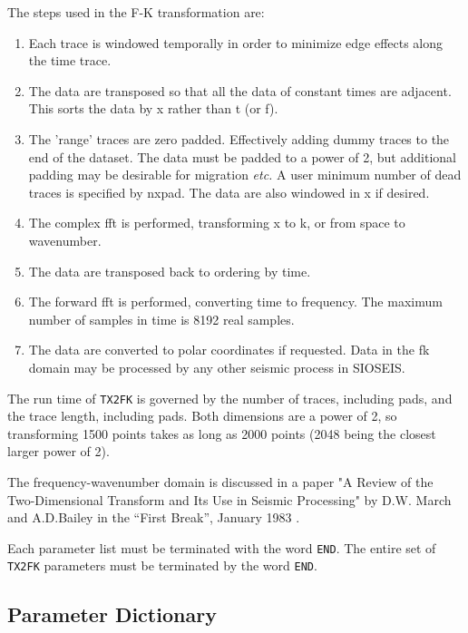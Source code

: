 The steps used in the F-K transformation are:
\begin{enumerate}
    \item  Each trace is windowed temporally in order to minimize edge effects
     along the time trace.
 \item  The data are transposed so that all the data of constant times are
     adjacent. This sorts the data by x rather than t (or f).
 \item  The 'range' traces are zero padded. Effectively adding dummy traces
     to the end of the dataset. The data must be padded to a power of 2,
     but additional padding may be desirable for migration \textit{etc.} A user
     minimum number of dead traces is specified by nxpad. The data are
     also windowed in x if desired.
 \item  The complex \gls{fft} is performed, transforming x to k, or from space to
     wavenumber.
 \item  The data are transposed back to ordering by time.
 \item  The forward \gls{fft} is performed, converting time to frequency.  The
     maximum number of samples in time is 8192 real samples.
 \item  The data are converted to polar coordinates if requested.  Data in
     the fk domain may be processed by any other seismic process in
     SIOSEIS.
\end{enumerate}

The run time of \texttt{TX2FK} is governed by the number of traces, including pads,
and the trace length, including pads.  Both dimensions are a power of 2,
so transforming 1500 points takes as long as 2000 points (2048 being the
closest larger power of 2).

The frequency-wavenumber domain is discussed in a paper "A Review of the
Two-Dimensional Transform and Its Use in Seismic Processing" by
D.W. March and A.D.Bailey in the ``First Break'', January 1983 \cite{March1983}.

Each parameter list must be terminated with the word \texttt{END}.  The entire set
of \texttt{TX2FK} parameters must be terminated by the word \texttt{END}.

\subsection{Parameter Dictionary}


